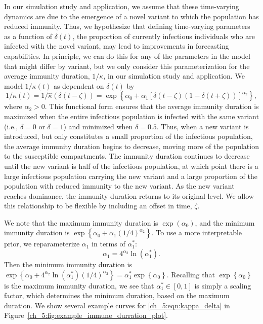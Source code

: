 In our simulation study and application, we assume that these time-varying dynamics are due to the emergence of a novel variant to which the population has reduced immunity.
Thus, we hypothesize that defining time-varying parameters as a function of \( \delta(t) \), the proportion of currently infectious individuals who are infected with the novel variant, may lead to improvements in forecasting capabilities.
In principle, we can do this for any of the parameters in the model that might differ by variant, but we only consider this parameterization for the average immunity duration, \( 1 / \kappa \), in our simulation study and application.
We model \( 1 / \kappa(t) \) as dependent on \( \delta(t) \) by
\begin{equation}
    1 / \kappa(t) = 1 / \hat{\kappa}\left( \delta (t - \zeta) \right) = \exp \left\{ \alpha_0 + \alpha_1 \left[ \delta(t - \zeta) \left( 1 - \delta(t + \zeta) \right) \right]^{\alpha_2} \right\},
    \label{ch_5:eqn:kappa_delta}
\end{equation}
where \( \alpha_2 > 0 \).
This functional form ensures that the average immunity duration is maximized when the entire infectious population is infected with the same variant (i.e., \( \delta = 0 \) or \( \delta = 1 \)) and minimized when \( \delta = 0.5 \).
Thus, when a new variant is introduced, but only constitutes a small proportion of the infectious population, the average immunity duration begins to decrease, moving more of the population to the susceptible compartments.
The immunity duration continues to decrease until the new variant is half of the infectious population, at which point there is a large infectious population carrying the new variant and a large proportion of the population with reduced immunity to the new variant.
As the new variant reaches dominance, the immunity duration returns to its original level.
We allow this relationship to be flexible by including an offset in time, \( \zeta \).

We note that the maximum immunity duration is \( \exp \left( \alpha_0 \right)\), and the minimum immunity duration is \(\exp \left\{ \alpha_0 + \alpha_1 \left( 1/4  \right)^{\alpha_2} \right\} \).
To use a more interpretable prior, we reparameterize \( \alpha_1 \) in terms of \( \alpha_1^* \):
\begin{equation}
    \alpha_1 = 4^{\alpha_2} \ln \left( \alpha_1^* \right).
    \label{ch_5:eqn:alpha_1}
\end{equation}
Then the minimum immunity duration is 
\( \exp \left\{ \alpha_0 + 4^{\alpha_2} \ln \left( \alpha_1^* \right) \left( 1/4  \right)^{\alpha_2} \right\} = \alpha_1^* \exp \left\{ \alpha_0 \right\} \).
Recalling that \( \exp \left\{ \alpha_0 \right\} \) is the maximum immunity duration, we see that  \( \alpha_1^* \in [0,1] \) is simply a scaling factor, which determines the minimum duration, based on the maximum duration.
We show several example curves for \eqref{ch_5:eqn:kappa_delta} in Figure~\ref{ch_5:fig:example_immune_durration_plot}.

